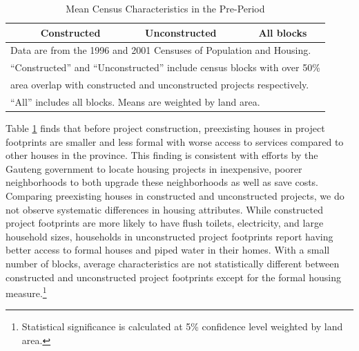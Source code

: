 \documentclass[12pt]{article}
\begin{document}
\begin{table}[h!]
	\centering
	\caption{Mean Census Characteristics in the Pre-Period}\label{table:projectdescriptivescensus}
\vspace{-2mm}
\begin{tabular}{l*{1}{ccc}}
\toprule
& Constructed & Unconstructed & All blocks \\
\midrule
 
\bottomrule
\multicolumn{4}{l}{\scriptsize Data are from the 1996 and 2001 Censuses of Population and Housing.} \\ [-.5em]
\multicolumn{4}{l}{\scriptsize ``Constructed'' and ``Unconstructed'' include census blocks with over 50\% } \\ [-.5em]
\multicolumn{4}{l}{\scriptsize  area overlap with constructed and unconstructed projects respectively. } \\ [-.5em]
\multicolumn{4}{l}{\scriptsize ``All''  includes all blocks.  Means are weighted by land area.}
\end{tabular}
\end{table}


Table \ref{table:projectdescriptivescensus} finds that before project construction, preexisting houses in project footprints are smaller and less formal with worse access to services compared to other houses in the province.  This finding is consistent with efforts by the Gauteng government to locate housing projects in inexpensive, poorer neighborhoods to both upgrade these neighborhoods as well as save costs.  Comparing preexisting houses in constructed and unconstructed projects, we do not observe systematic differences in housing attributes.  While constructed project footprints are more likely to have flush toilets, electricity, and large household sizes, households in unconstructed project footprints report having better access to formal houses and piped water in their homes.  With a small number of blocks, average characteristics are not statistically different between constructed and unconstructed project footprints except for the formal housing measure.\footnote{Statistical significance is calculated at 5\% confidence level weighted by land area.}
\end{document}
